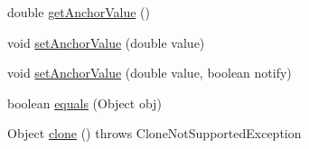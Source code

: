 \begin{DoxyCompactItemize}
\item 
double \mbox{\hyperlink{classorg_1_1jfree_1_1chart_1_1plot_1_1_category_plot_a7436b0bcbd290c89709539ad0e7c91be}{get\+Anchor\+Value}} ()
\item 
void \mbox{\hyperlink{classorg_1_1jfree_1_1chart_1_1plot_1_1_category_plot_a38b54324604b152b74491a08b2661257}{set\+Anchor\+Value}} (double value)
\item 
void \mbox{\hyperlink{classorg_1_1jfree_1_1chart_1_1plot_1_1_category_plot_a328492a0204cef0951139c4026d20d63}{set\+Anchor\+Value}} (double value, boolean notify)
\item 
boolean \mbox{\hyperlink{classorg_1_1jfree_1_1chart_1_1plot_1_1_category_plot_a9b2f357d14128c434271d69fe6d5969d}{equals}} (Object obj)
\item 
Object \mbox{\hyperlink{classorg_1_1jfree_1_1chart_1_1plot_1_1_category_plot_a386a09d10866ec306dabb6537bff62c9}{clone}} ()  throws Clone\+Not\+Supported\+Exception 
\end{DoxyCompactItemize}

